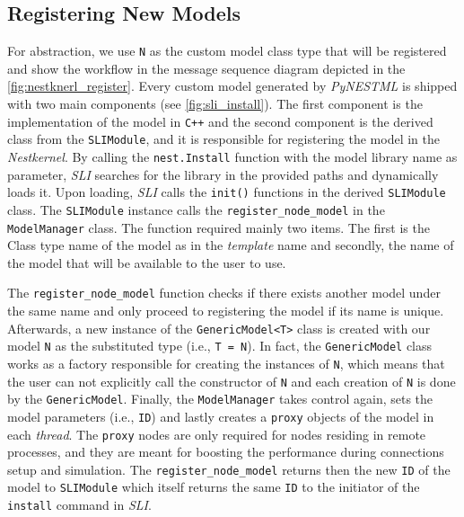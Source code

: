 \subsection{Registering New Models}

For abstraction, we use \texttt{N} as the custom model class type that will be registered and show the workflow in the message sequence diagram depicted in the   \autoref{fig:nestknerl_register}.  Every custom model generated by \emph{PyNESTML} is shipped with two main components (see \autoref{fig:sli_install}). The first component is the implementation of the model in \texttt{C++} and the second component is the derived class from the \texttt{SLIModule}, and it is responsible for registering the model in the \emph{Nestkernel}. By calling the \texttt{nest.Install} function
with the model library name as parameter, \emph{SLI} searches for the library in the provided paths and dynamically loads it. Upon loading, \emph{SLI} calls the \texttt{init()} functions in the derived \texttt{SLIModule} class. The \texttt{SLIModule} instance calls the \texttt{register\_node\_model}  in the \texttt{ModelManager} class. The function required mainly two items. The first is the Class  type name of the model as in the \emph{template} name and secondly, the name of the model that will be available to the user to use. 

The \texttt{register\_node\_model} function checks if there exists another model under the same name and only proceed to registering the model if its name is unique. Afterwards, a new instance of the \texttt{GenericModel<T>} class is created with our model \texttt{N} as the substituted type (i.e., \texttt{T = N}). In fact, the \texttt{GenericModel} class works as a factory responsible for creating the instances of \texttt{N}, which means that  the user can not explicitly call the constructor of \texttt{N} and each creation of \texttt{N} is done by the \texttt{GenericModel}. Finally, the \texttt{ModelManager} takes control again, sets the model parameters (i.e., \texttt{ID}) and lastly creates a \texttt{proxy} objects of the model in each \emph{thread}. The \texttt{proxy} nodes are only required for nodes residing in remote processes, and they are meant for boosting the performance during connections setup and simulation. The \texttt{register\_node\_model} returns then the new \texttt{ID} of the model to \texttt{SLIModule} which itself returns the same \texttt{ID} to the initiator of the \texttt{install} command in \emph{SLI}.
 
